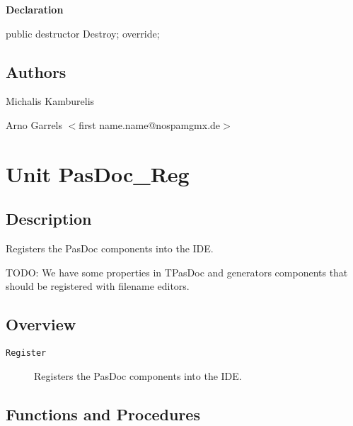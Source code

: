 \documentclass{report}
\newif\ifpdf
\begin{document}
\label{PasDoc_ProcessLineTalk.TProcessLineTalk-Destroy}
\begin{list}{}{
\setlength{\itemindent}{0cm}
\setlength{\listparindent}{0cm}
\setlength{\leftmargin}{\evensidemargin}
\addtolength{\leftmargin}{\tmplength}
\settowidth{\labelsep}{X}
\addtolength{\leftmargin}{\labelsep}
\setlength{\labelwidth}{\tmplength}
}
\item[\textbf{Declaration}\hfill]
\ifpdf
\begin{flushleft}
\fi
\begin{ttfamily}
public destructor Destroy; override;\end{ttfamily}

\ifpdf
\end{flushleft}
\fi

\end{list}
\section{Authors}
\par
Michalis Kamburelis

\par
Arno Garrels {$<$}first name.name@nospamgmx.de{$>$}

\chapter{Unit PasDoc{\_}Reg}
\label{PasDoc_Reg}
\section{Description}
Registers the PasDoc components into the IDE. \hfill\vspace*{1ex}

   

TODO: We have some properties in TPasDoc and generators components that should be registered with filename editors.
\section{Overview}
\begin{description}
\item[\texttt{Register}]Registers the PasDoc components into the IDE.
\end{description}
\section{Functions and Procedures}
\ifpdf
\end{document}
